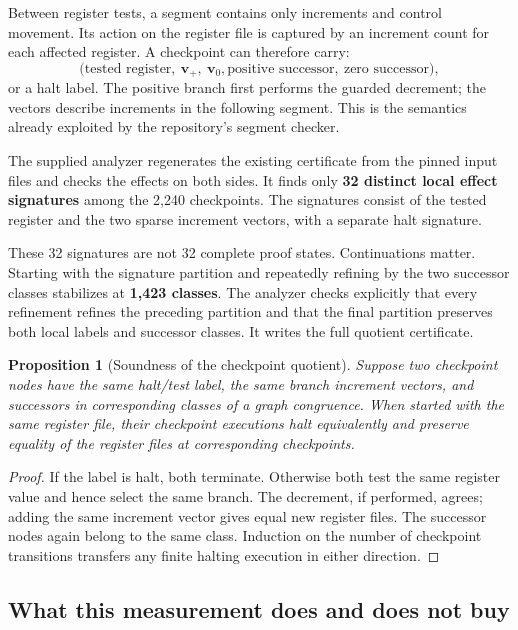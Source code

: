 \documentclass[11pt,letterpaper]{article}
\newtheorem{proposition}[theorem]{Proposition}
\theoremstyle{definition}
\begin{document}
Between register tests, a segment contains only increments and control
movement. Its action on the register file is captured by an increment
count for each affected register. A checkpoint can therefore carry:
\[
 \bigl(\text{tested register},\ \mathbf v_{+},\ \mathbf v_{0},
        \text{positive successor},\ \text{zero successor}\bigr),
\]
or a halt label. The positive branch first performs the guarded decrement;
the vectors describe increments in the following segment. This is the
semantics already exploited by the repository's segment checker.

The supplied analyzer regenerates the existing certificate from the
pinned input files and checks the effects on both sides. It finds only
\textbf{32 distinct local effect signatures} among the 2,240 checkpoints.
The signatures consist of the tested register and the two sparse
increment vectors, with a separate halt signature.

These 32 signatures are not 32 complete proof states. Continuations
matter. Starting with the signature partition and repeatedly refining by
the two successor classes stabilizes at \textbf{1,423 classes}. The
analyzer checks explicitly that every refinement refines the preceding
partition and that the final partition preserves both local labels and
successor classes. It writes the full quotient certificate.

\begin{proposition}[Soundness of the checkpoint quotient]
Suppose two checkpoint nodes have the same halt/test label, the same
branch increment vectors, and successors in corresponding classes of a
graph congruence. When started with the same register file, their
checkpoint executions halt equivalently and preserve equality of the
register files at corresponding checkpoints.
\end{proposition}

\begin{proof}
If the label is halt, both terminate. Otherwise both test the same
register value and hence select the same branch. The decrement, if
performed, agrees; adding the same increment vector gives equal new
register files. The successor nodes again belong to the same class.
Induction on the number of checkpoint transitions transfers any finite
halting execution in either direction.
\end{proof}

\subsection{What this measurement does and does not buy}
\end{document}
